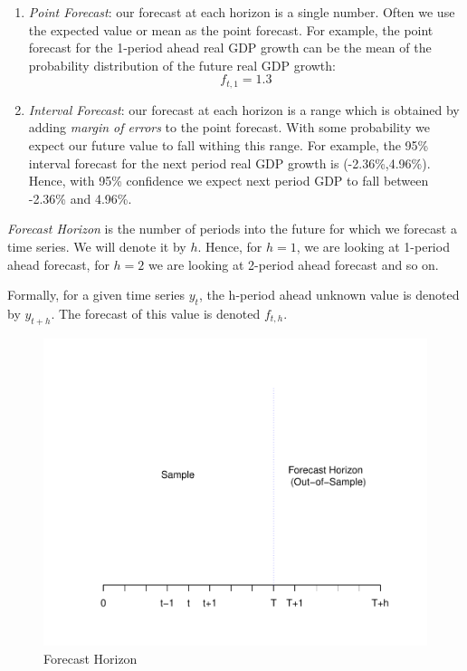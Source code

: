 \documentclass[]{book}
\theoremstyle{definition}
\theoremstyle{definition}
\theoremstyle{definition}
\theoremstyle{remark}
\let\BeginKnitrBlock\begin \let\EndKnitrBlock\end
\begin{document}
\begin{enumerate}
\def\labelenumi{\arabic{enumi}.}
\setcounter{enumi}{1}
\item
  \emph{Point Forecast}: our forecast at each horizon is a single
  number. Often we use the expected value or mean as the point forecast.
  For example, the point forecast for the 1-period ahead real GDP growth
  can be the mean of the probability distribution of the future real GDP
  growth: \begin{equation}
  f_{t,1}=1.3%
  \end{equation}
\item
  \emph{Interval Forecast}: our forecast at each horizon is a range
  which is obtained by adding \emph{margin of errors} to the point
  forecast. With some probability we expect our future value to fall
  withing this range. For example, the 95\% interval forecast for the
  next period real GDP growth is (-2.36\%,4.96\%). Hence, with 95\%
  confidence we expect next period GDP to fall between -2.36\% and
  4.96\%.
\end{enumerate}

\BeginKnitrBlock{definition}[Forecast Horizon]
\protect\hypertarget{def:d2}{}{\label{def:d2} {} }
\EndKnitrBlock{definition}

\emph{Forecast Horizon} is the number of periods into the future for
which we forecast a time series. We will denote it by \(h\). Hence, for
\(h=1\), we are looking at 1-period ahead forecast, for \(h=2\) we are
looking at 2-period ahead forecast and so on.

Formally, for a given time series \(y_t\), the h-period ahead unknown
value is denoted by \(y_{t+h}\). The forecast of this value is denoted
\(f_{t,h}\).

\begin{figure}

{\centering \includegraphics[width=0.8\linewidth]{bookdown-demo_files/figure-latex/ch1-figure4-1} 

}

\caption{Forecast Horizon}\label{fig:ch1-figure4}
\end{figure}
\end{document}
